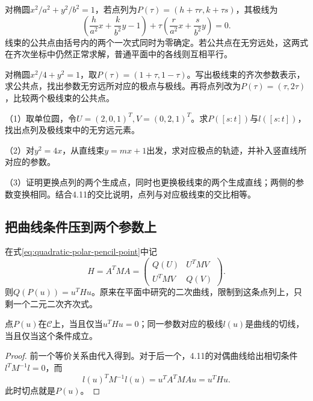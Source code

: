 对椭圆\(x^2/a^2+y^2/b^2=1\)，若点列为\(P(\tau)=(h+\tau r,k+\tau s)\)，其极线为
\begin{equation*}
 \left(\frac h{a^2}x+\frac k{b^2}y-1\right)
 +\tau\left(\frac r{a^2}x+\frac s{b^2}y\right)=0.
\end{equation*}
线束的公共点由括号内的两个一次式同时为零确定。若公共点在无穷远处，这两式在齐次坐标中仍然正常求解，普通平面中的各线则互相平行。

\begin{example}
对椭圆\(x^2/4+y^2=1\)，取\(P(\tau)=(1+\tau,1-\tau)\)。写出极线束的齐次参数表示，求公共点，找出参数无穷远所对应的极点与极线。再将点列改为\(P(\tau)=(\tau,2\tau)\)，比较两个极线束的公共点。
\end{example}

\begin{exercise}
\mbox{}\par\nobreak

（1）取单位圆，令\(U=(2,0,1)^T,V=(0,2,1)^T\)。求\(P([s:t])\)与\(l([s:t])\)，找出点列及极线束中的无穷远元素。

（2）对\(y^2=4x\)，从直线束\(y=mx+1\)出发，求对应极点的轨迹，并补入竖直线所对应的参数。

（3）证明更换点列的两个生成点，同时也更换极线束的两个生成直线；两侧的参数变换相同。结合4.11的交比说明，点列与对应极线束的交比相等。
\end{exercise}

\subsection{把曲线条件压到两个参数上}
\label{subsec:quadratic-polar-pencil-restriction}

在式\eqref{eq:quadratic-polar-pencil-point}中记
\begin{equation}\label{eq:quadratic-polar-pencil-gram}
 H=A^TMA=
 \begin{pmatrix}Q(U)&U^TMV\\U^TMV&Q(V)\end{pmatrix}.
\end{equation}
则\(Q(P(u))=u^THu\)。原来在平面中研究的二次曲线，限制到这条点列上，只剩一个二元二次齐次式。

\begin{proposition}
点\(P(u)\)在\(\mathcal C\)上，当且仅当\(u^THu=0\)；同一参数对应的极线\(l(u)\)是曲线的切线，当且仅当这个条件成立。
\end{proposition}

\begin{proof}
前一个等价关系由代入得到。对于后一个，4.11的对偶曲线给出相切条件\(l^TM^{-1}l=0\)，而
\begin{equation*}
 l(u)^TM^{-1}l(u)=u^TA^TMAu=u^THu.
\end{equation*}
此时切点就是\(P(u)\)。
\end{proof}


